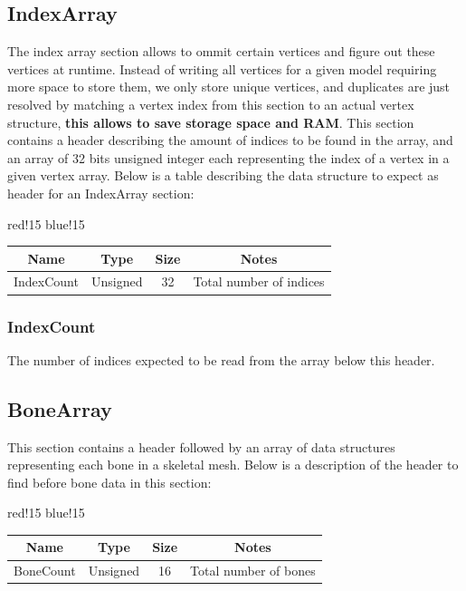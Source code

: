 \subsection{IndexArray}
The index array section allows to ommit certain vertices and figure out these vertices at runtime. Instead of writing all vertices for a given model requiring more space to store them, we only store unique vertices, and duplicates are just resolved by matching a vertex index from this section to an actual vertex structure, \textbf{this allows to save storage space and RAM}.\newline
This section contains a header describing the amount of indices to be found in the array, and an array of 32 bits unsigned integer each representing the index of a vertex in a given vertex array.\newline
Below is a table describing the data structure to expect as header for an IndexArray section:
\begin{center}
    {
        {red!15}
        {blue!15}
        \begin{tabular}{|c|c|c|c|}
            \hline
            \textbf{Name} & \textbf{Type} & \textbf{Size} & \textbf{Notes} \\
    
            \hline\hline
            IndexCount & Unsigned & 32 & Total number of indices \\
            \hline
        \end{tabular}
    }
\end{center}

\subsubsection{IndexCount}
The number of indices expected to be read from the array below this header.

\subsection{BoneArray}
This section contains a header followed by an array of data structures representing each bone in a skeletal mesh.\newline
Below is a description of the header to find before bone data in this section:
\begin{center}
    {
        {red!15}
        {blue!15}
        \begin{tabular}{|c|c|c|c|}
            \hline
            \textbf{Name} & \textbf{Type} & \textbf{Size} & \textbf{Notes} \\
    
            \hline\hline
            BoneCount & Unsigned & 16 & Total number of bones \\
            \hline
        \end{tabular}
    }
\end{center}

